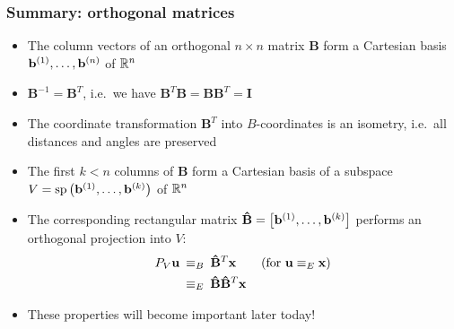 \begin{frame}
  \frametitle{Summary: orthogonal matrices}

  \begin{itemize}
  \item The column vectors of an orthogonal $n\times n$ matrix $\mathbf{B}$
    form a Cartesian basis $\vb[1],\ldots,\vb[n]$ of $\mathbb{R}^n$%
    \pause
  \item $\mathbf{B}^{-1} = \mathbf{B}^T$, i.e.\ we have $\mathbf{B}^T
    \mathbf{B} = \mathbf{B} \mathbf{B}^T = \mathbf{I}$%
    \pause
  \item The coordinate transformation $\mathbf{B}^T$ into $B$-coordinates is an
    isometry, i.e.\ all distances and angles are preserved%
    \pause
  \item The first $k < n$ columns of $\mathbf{B}$ form a Cartesian basis of a
    subspace $V = \Span{\vb[1],\ldots,\vb[k]}$ of $\mathbb{R}^n$%
    \pause
  \item The corresponding rectangular matrix $\mathbf{\hat{B}} =
    \bigl[\vb[1],\ldots,\vb[k]\bigr]$ performs an orthogonal projection into
    $V$:
    \begin{align*}
      P_V \vu  &\:\equiv_{B}\: \mathbf{\hat{B}}^T \vx 
      \qquad \text{(for } \vu \equiv_E \vx \text{)}\\
      &\:\equiv_{E}\: \mathbf{\hat{B}} \mathbf{\hat{B}}^T \vx 
    \end{align*}
  \item[\So] These properties will become important later today!
\end{itemize}
\end{frame}



